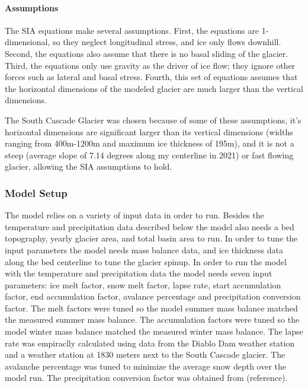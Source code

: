 \documentclass{article}
\begin{document}
\paragraph{Assumptions}

The SIA equations make several assumptions. First, the equations are 1-dimensional, so they neglect longitudinal stress, and ice only flows downhill. Second, the equations 
also assume that there is no basal sliding of the glacier. Third, the equations only use gravity as the driver of ice flow; they ignore other 
forces such as lateral and basal stress. Fourth, this set of equations assumes that the horizontal dimensions of the modeled glacier are much 
larger than the vertical dimensions.

The South Cascade Glacier was chosen because of some of these assumptions, it's horizontal dimensions are significant larger than its vertical 
dimensions (widths ranging from 400m-1200m and maximum ice thickness of 195m), and it is not a steep (average slope of 7.14 degrees along my 
centerline in 2021) or fast flowing glacier, allowing the SIA assumptions to hold.

\subsubsection{Model Setup}
The model relies on a variety of input data in order to run. Besides the temperature and precipitation data described below the model also 
needs a bed topography, yearly glacier area, and total basin area to run. In order to tune the input parameters the model needs mass balance 
data, and ice thickness data along the bed centerline to tune the glacier spinup. In order to run the model with the temperature and 
precipitation data the model needs seven input parameters: ice melt factor, snow melt factor, lapse rate, start accumulation factor, end 
accumulation factor, avalance percentage and precipitation conversion factor. The melt factors were tuned so the model summer mass balance 
matched the measured summer mass balance. The accumulation factors were tuned so the model winter mass balance matched the measured winter 
mass balance. The lapse rate was empiraclly calculated using data from the Diablo Dam weather station and a weather station at 1830 meters 
next to the South Cascade glacier. The avalanche percentage was tuned to minimize the average snow depth over the model run. The precipitation 
conversion factor was obtained from (reference).
\end{document}
